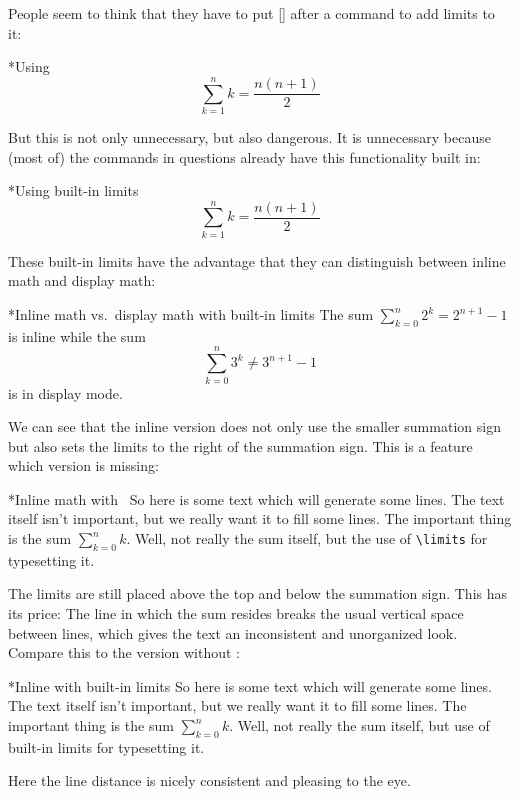 People seem to think that they have to put [\comname] after a command to add limits to it:
\begin{showlatex}*{Using~}
\[
  \sum\limits_{k=1}^n k
  =
  \frac{n(n+1)}{2}
\]
\end{showlatex}
But this is not only unnecessary, but also dangerous.
It is unnecessary because (most of) the commands in questions already have this functionality built in:
\begin{showlatex}*{Using built-in limits}
\[
  \sum_{k=1}^n k
  =
  \frac{n(n+1)}{2}
\]
\end{showlatex}
These built-in limits have the advantage that they can distinguish between inline math and display math:
\begin{showlatex}*{Inline math vs.\ display math with built-in limits}
The sum $\sum_{k=0}^n 2^k = 2^{n+1} - 1$ is inline while the sum
\[
  \sum_{k=0}^n 3^k
  \neq
  3^{n+1} - 1
\]
is in display mode.
\end{showlatex}
We can see that the inline version does not only use the smaller summation sign but also sets the limits to the right of the summation sign.
This is a feature which  version is missing:
\begin{showlatex}*{Inline math with~}
So here is some text which will generate some lines.
The text itself isn’t important, but we really want it to fill some lines.
The important thing is the sum $\sum\limits_{k=0}^n k$.
Well, not really the sum itself, but the use of \texttt{{\textbackslash}limits} for typesetting it.
\end{showlatex}
The limits are still placed above the top and below the summation sign.
This has its price:
The line in which the sum resides breaks the usual vertical space between lines, which gives the text an inconsistent and unorganized look.
Compare this to the version without :
\begin{showlatex}*{Inline with built-in limits}
So here is some text which will generate some lines.
The text itself isn’t important, but we really want it to fill some lines.
The important thing is the sum $\sum_{k=0}^n k$.
Well, not really the sum itself, but use of built-in limits for typesetting it.
\end{showlatex}
Here the line distance is nicely consistent and pleasing to the eye.

